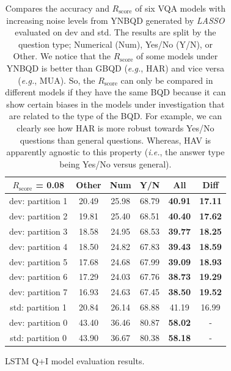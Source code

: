 \documentclass[letterpaper]{article}
\newcommand{\ie}{}\def\ie/{{\em i.e.}}
\newcommand{\eg}{}\def\eg/{{\em e.g.}}
\newcommand{\lasso}{}\def\lasso/{\textit{LASSO}}
\newcommand{\rscore}{}\def\rscore/{$R_{\text{score}}$}
\begin{document}
\begin{table}
\begin{subtable}{0.49\linewidth}
		\begin{adjustbox}{width=0.46\columnwidth}
\begin{tabular}{c | c c c c | c}
			\rscore/ = 0.08  & Other & Num   & Y/N   & All            & Diff           \\ [0.5ex]
			\hline
			dev: partition 1 & 20.49 & 25.98 & 68.79 & \textbf{40.91} & \textbf{17.11} \\
			dev: partition 2 & 19.81 & 25.40 & 68.51 & \textbf{40.40} & \textbf{17.62} \\
			dev: partition 3 & 18.58 & 24.95 & 68.53 & \textbf{39.77} & \textbf{18.25} \\
			dev: partition 4 & 18.50 & 24.82 & 67.83 & \textbf{39.43} & \textbf{18.59} \\
			dev: partition 5 & 17.68 & 24.68 & 67.99 & \textbf{39.09} & \textbf{18.93} \\
			dev: partition 6 & 17.29 & 24.03 & 67.76 & \textbf{38.73} & \textbf{19.29} \\
			dev: partition 7 & 16.93 & 24.63 & 67.45 & \textbf{38.50} & \textbf{19.52} \\
			\hline
			std: partition 1 & 20.84 & 26.14 & 68.88 & 41.19          & 16.99          \\
			\hline
			dev: partition 0 & 43.40 & 36.46 & 80.87 & \textbf{58.02} & -              \\
			std: partition 0 & 43.90 & 36.67 & 80.38 & \textbf{58.18} & -              \\
			\hline
		\end{tabular}
\end{adjustbox}
		\caption{LSTM Q+I model evaluation results.}
	\end{subtable}
	\caption{Compares the accuracy and \rscore/ of six VQA models with increasing noise levels from YNBQD generated by \lasso/ evaluated on dev and std. The results are split by the question type; Numerical (Num), Yes/No (Y/N), or Other. We notice that the \rscore/ of some models under YNBQD is better than GBQD (\eg/, HAR) and vice versa (\eg/, MUA). So, the \rscore/ can only be compared in different models if they have the same BQD because it can show certain biases in the models under investigation that are related to the type of the BQD. For example, we can clearly see how HAR is more robust towards Yes/No questions than general questions. Whereas, HAV is apparently agnostic to this property (\ie/, the answer type being Yes/No versus general).}
	\label{tbl:lasso_ynbqd}
\end{table}
\end{document}
